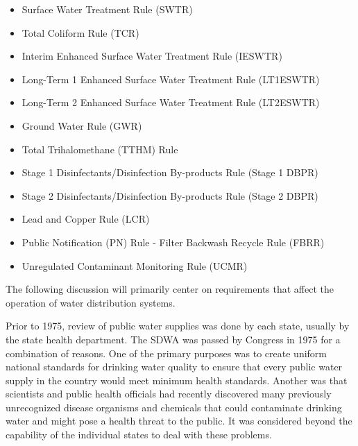 \documentclass[10pt]{article}
\begin{document}
\begin{itemize}
  \item Surface Water Treatment Rule (SWTR)

  \item Total Coliform Rule (TCR)

  \item Interim Enhanced Surface Water Treatment Rule (IESWTR)

  \item Long-Term 1 Enhanced Surface Water Treatment Rule (LT1ESWTR)

  \item Long-Term 2 Enhanced Surface Water Treatment Rule (LT2ESWTR)

  \item Ground Water Rule (GWR)

  \item Total Trihalomethane (TTHM) Rule

  \item Stage 1 Disinfectants/Disinfection By-products Rule (Stage 1 DBPR)

  \item Stage 2 Disinfectants/Disinfection By-products Rule (Stage 2 DBPR)

  \item Lead and Copper Rule (LCR)

  \item Public Notification (PN) Rule - Filter Backwash Recycle Rule (FBRR)

  \item Unregulated Contaminant Monitoring Rule (UCMR)

\end{itemize}
The following discussion will primarily center on requirements that affect the operation of water distribution systems.

Prior to 1975, review of public water supplies was done by each state, usually by the state health department. The SDWA was passed by Congress in 1975 for a combination of reasons. One of the primary purposes was to create uniform national standards for drinking water quality to ensure that every public water supply in the country would meet minimum health standards. Another was that scientists and public health officials had recently discovered many previously unrecognized disease organisms and chemicals that could contaminate drinking water and might pose a health threat to the public. It was considered beyond the capability of the individual states to deal with these problems.
\end{document}

